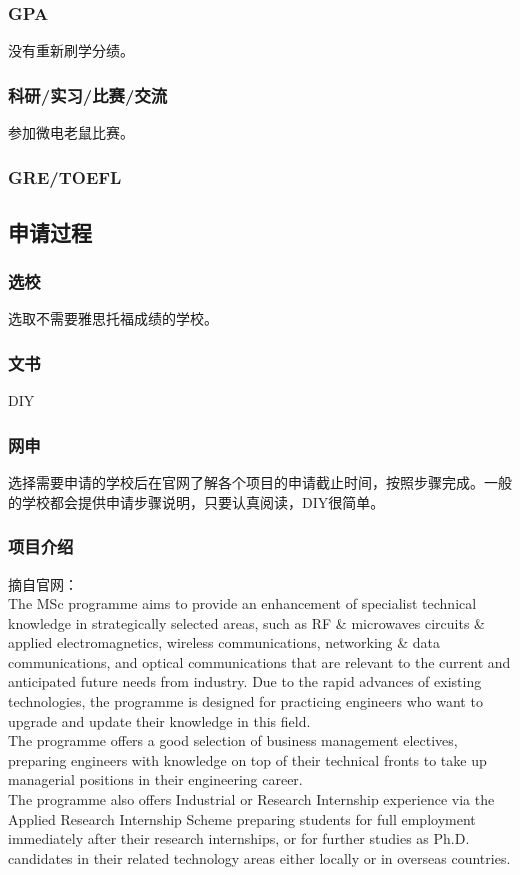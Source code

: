 \documentclass[a4paper,UTF8]{book}
\begin{document}
        \subsubsection*{GPA}
        没有重新刷学分绩。
        \subsubsection*{科研/实习/比赛/交流}
        参加微电老鼠比赛。
        \subsubsection*{GRE/TOEFL}

    \subsection*{申请过程}
        \subsubsection*{选校}
        选取不需要雅思托福成绩的学校。
        \subsubsection*{文书}
        DIY
        \subsubsection*{网申}
        选择需要申请的学校后在官网了解各个项目的申请截止时间，按照步骤完成。一般的学校都会提供申请步骤说明，只要认真阅读，DIY很简单。
        \subsubsection*{项目介绍}
        摘自官网：\\
        The MSc programme aims to provide an enhancement of specialist technical knowledge in strategically selected areas, such as RF \& microwaves circuits \& applied electromagnetics, wireless communications, networking \& data communications, and optical communications that are relevant to the current and anticipated future needs from industry. Due to the rapid advances of existing technologies, the programme is designed for practicing engineers who want to upgrade and update their knowledge in this field.\\
        The programme offers a good selection of business management electives, preparing engineers with knowledge on top of their technical fronts to take up managerial positions in their engineering career.\\
        The programme also offers Industrial or Research Internship experience via the Applied Research Internship Scheme preparing students for full employment immediately after their research internships, or for further studies as Ph.D. candidates in their related technology areas either locally or in overseas countries.
\end{document}
